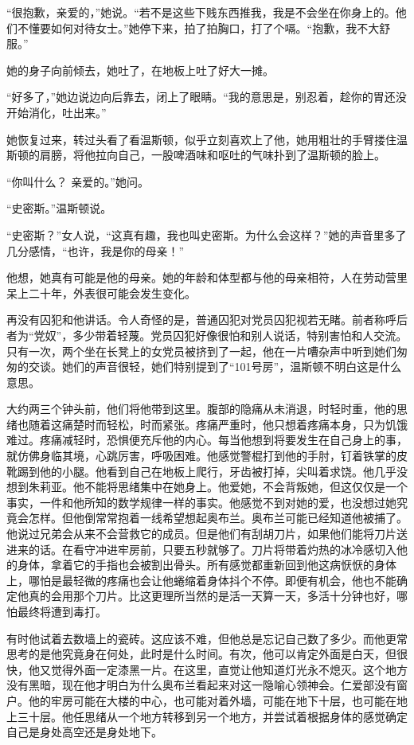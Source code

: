 ``很抱歉，亲爱的，''她说。``若不是这些下贱东西推我，我是不会坐在你身上的。他们不懂要如何对待女士。''她停下来，拍了拍胸口，打了个嗝。``抱歉，我不大舒服。''

她的身子向前倾去，她吐了，在地板上吐了好大一摊。

``好多了，''她边说边向后靠去，闭上了眼睛。``我的意思是，别忍着，趁你的胃还没开始消化，吐出来。''

她恢复过来，转过头看了看温斯顿，似乎立刻喜欢上了他，她用粗壮的手臂搂住温斯顿的肩膀，将他拉向自己，一股啤酒味和呕吐的气味扑到了温斯顿的脸上。

``你叫什么？ 亲爱的。''她问。

``史密斯。''温斯顿说。

``史密斯？''女人说，``这真有趣，我也叫史密斯。为什么会这样？''她的声音里多了几分感情，``也许，我是你的母亲！''

他想，她真有可能是他的母亲。她的年龄和体型都与他的母亲相符，人在劳动营里呆上二十年，外表很可能会发生变化。

再没有囚犯和他讲话。令人奇怪的是，普通囚犯对党员囚犯视若无睹。前者称呼后者为``党奴''，多少带着轻蔑。党员囚犯好像很怕和别人说话，特别害怕和人交流。只有一次，两个坐在长凳上的女党员被挤到了一起，他在一片嘈杂声中听到她们匆匆的交谈。她们的声音很轻，她们特别提到了``101号房''，温斯顿不明白这是什么意思。

大约两三个钟头前，他们将他带到这里。腹部的隐痛从未消退，时轻时重，他的思绪也随着这痛楚时而轻松，时而紧张。疼痛严重时，他只想着疼痛本身，只为饥饿难过。疼痛减轻时，恐惧便充斥他的内心。每当他想到将要发生在自己身上的事，就仿佛身临其境，心跳厉害，呼吸困难。他感觉警棍打到他的手肘，钉着铁掌的皮靴踢到他的小腿。他看到自己在地板上爬行，牙齿被打掉，尖叫着求饶。他几乎没想到朱莉亚。他不能将思绪集中在她身上。他爱她，不会背叛她，但这仅仅是一个事实，一件和他所知的数学规律一样的事实。他感觉不到对她的爱，也没想过她究竟会怎样。但他倒常常抱着一线希望想起奥布兰。奥布兰可能已经知道他被捕了。他说过兄弟会从来不会营救它的成员。但是他们有刮胡刀片，如果他们能将刀片送进来的话。在看守冲进牢房前，只要五秒就够了。刀片将带着灼热的冰冷感切入他的身体，拿着它的手指也会被割出骨头。所有感觉都重新回到他这病恹恹的身体上，哪怕是最轻微的疼痛也会让他蜷缩着身体抖个不停。即便有机会，他也不能确定他真的会用那个刀片。比这更理所当然的是活一天算一天，多活十分钟也好，哪怕最终将遭到毒打。

有时他试着去数墙上的瓷砖。这应该不难，但他总是忘记自己数了多少。而他更常思考的是他究竟身在何处，此时是什么时间。有次，他可以肯定外面是白天，但很快，他又觉得外面一定漆黑一片。在这里，直觉让他知道灯光永不熄灭。这个地方没有黑暗，现在他才明白为什么奥布兰看起来对这一隐喻心领神会。仁爱部没有窗户。他的牢房可能在大楼的中心，也可能对着外墙，可能在地下十层，也可能在地上三十层。他任思绪从一个地方转移到另一个地方，并尝试着根据身体的感觉确定自己是身处高空还是身处地下。

